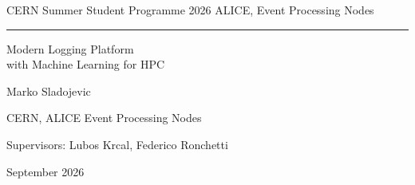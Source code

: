 



\begin{titlepage}
\thispagestyle{empty}
\vspace*{18mm}
{\small\color{inksoft}CERN Summer Student Programme 2026 \hfill ALICE, Event Processing Nodes}\par
\vspace{2mm}\textcolor{rule}{\hrule}\vspace{14mm}
{\Huge\bfseries\raggedright Modern Logging Platform\\ with Machine Learning for HPC\par}
\vspace{16mm}
{\large Marko Sladojevic\par}
\vspace{1.5mm}
{\normalsize CERN, ALICE Event Processing Nodes\par}
\vspace{8mm}
{\normalsize Supervisors: Lubos Krcal, Federico Ronchetti\par}
\vspace{1.5mm}
{\normalsize September 2026\par}
\vfill
\begin{abstract}

\end{abstract}
\vspace{6mm}
\end{titlepage}

{\small\setlength{\parskip}{0pt}\tableofcontents}
\vspace{6pt}













